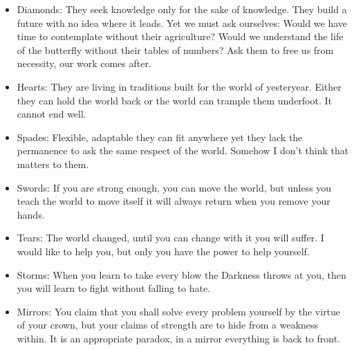 \begin{itemize}
\item Diamonds: They seek knowledge only for the sake of knowledge. They build a future with no idea where it leads. Yet we must ask ourselves: Would we have time to contemplate without their agriculture? Would we understand the life of the butterfly without their tables of numbers? Ask them to free us from necessity, our work comes after.
\item Hearts: They are living in traditions built for the world of yesteryear. Either they can hold the world back or the world can trample them underfoot. It cannot end well.
\item Spades: Flexible, adaptable they can fit anywhere yet they lack the permanence to ask the same respect of the world. Somehow I don't think that matters to them.
\item Swords: If you are strong enough, you can move the world, but unless you teach the world to move itself it will always return when you remove your hands.

\item Tears: The world changed, until you can change with it you will suffer. I would like to help you, but only you have the power to help yourself. 
\item Storms: When you learn to take every blow the Darkness throws at you, then you will learn to fight without falling to hate. 
\item Mirrors: You claim that you shall solve every problem yourself by the virtue of your crown, but your claims of strength are to hide from a weakness within. It is an appropriate paradox, in a mirror everything is back to front.       


\end{itemize}
